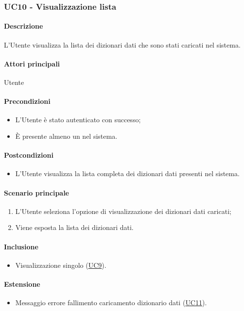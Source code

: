 \subsubsection{UC10 - Visualizzazione lista }\label{UC10}
\paragraph*{Descrizione}
L’Utente visualizza la lista dei dizionari dati che sono stati caricati nel sistema.

\paragraph*{Attori principali}
Utente

\paragraph*{Precondizioni}
\begin{itemize}
  \item L’Utente è stato autenticato con successo;
  \item È presente almeno un  nel sistema.  
\end{itemize}

\paragraph*{Postcondizioni}
\begin{itemize}
  \item L’Utente visualizza la lista completa dei dizionari dati presenti nel sistema.
\end{itemize}

\paragraph*{Scenario principale}
\begin{enumerate}
  \item L’Utente seleziona l’opzione di visualizzazione dei dizionari dati caricati;
  \item Viene esposta la lista dei dizionari dati.  
\end{enumerate}

\paragraph*{Inclusione}
\begin{itemize}
  \item Visualizzazione singolo  (\hyperref[UC9]{UC9}).
\end{itemize}

\paragraph*{Estensione}
\begin{itemize}
  \item Messaggio errore fallimento caricamento dizionario dati (\hyperref[UC11]{UC11}).
\end{itemize}
